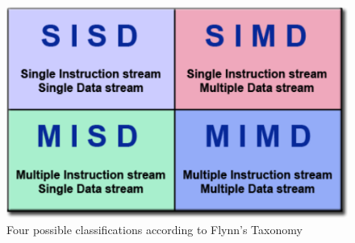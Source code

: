 \documentclass[a4paper, 11pt]{report}
\begin{document}
	\begin{figure}[ht]
		\centering
		\includegraphics[scale=.5]{images/flynnsTaxonomy.pdf}
		\caption{Four possible classifications according to Flynn's Taxonomy}
		\label{fig:flynnTaxonomy}
	\end{figure}
	
\end{document}
